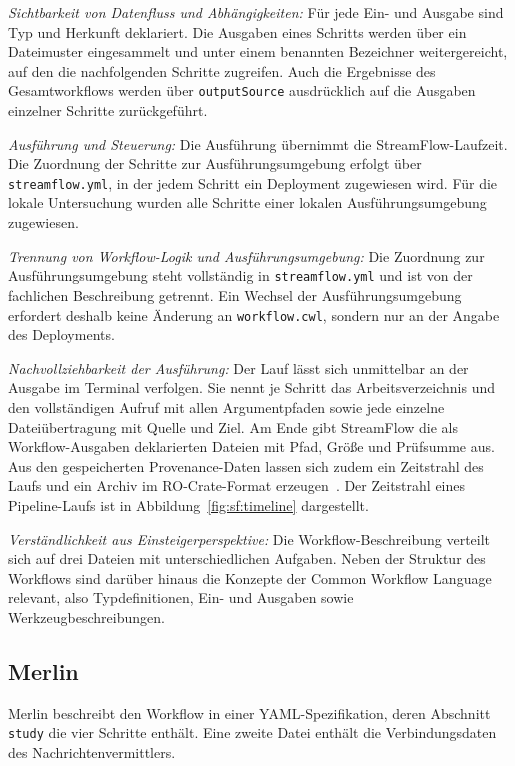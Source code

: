 \emph{Sichtbarkeit von Datenfluss und Abhängigkeiten:} Für jede Ein-
und Ausgabe sind Typ und Herkunft deklariert. Die Ausgaben eines
Schritts werden über ein Dateimuster eingesammelt und unter einem
benannten Bezeichner weitergereicht, auf den die nachfolgenden
Schritte zugreifen. Auch die Ergebnisse des Gesamtworkflows werden
über \texttt{outputSource} ausdrücklich auf die Ausgaben einzelner
Schritte zurückgeführt.

\emph{Ausführung und Steuerung:} Die Ausführung übernimmt die
StreamFlow-Laufzeit. Die Zuordnung der Schritte zur
Ausführungsumgebung erfolgt über \texttt{streamflow.yml}, in der
jedem Schritt ein Deployment zugewiesen wird. Für die lokale
Untersuchung wurden alle Schritte einer lokalen Ausführungsumgebung
zugewiesen.

\emph{Trennung von Workflow-Logik und Ausführungsumgebung:} Die
Zuordnung zur Ausführungsumgebung steht vollständig in
\texttt{streamflow.yml} und ist von der fachlichen Beschreibung
getrennt. Ein Wechsel der Ausführungsumgebung erfordert deshalb keine
Änderung an \texttt{workflow.cwl}, sondern nur an der Angabe des
Deployments.


\emph{Nachvollziehbarkeit der Ausführung:} Der Lauf lässt sich
unmittelbar an der Ausgabe im Terminal verfolgen. Sie nennt je Schritt
das Arbeitsverzeichnis und den vollständigen Aufruf mit allen
Argumentpfaden sowie jede einzelne Dateiübertragung mit Quelle und
Ziel. Am Ende gibt StreamFlow die als Workflow-Ausgaben deklarierten
Dateien mit Pfad, Größe und Prüfsumme aus. Aus den gespeicherten
Provenance-Daten lassen sich zudem ein Zeitstrahl des Laufs und ein
Archiv im RO-Crate-Format erzeugen~\cite{streamflowdocs-inspect}. Der
Zeitstrahl eines Pipeline-Laufs ist in
Abbildung~\ref{fig:sf:timeline} dargestellt.

\emph{Verständlichkeit aus Einsteigerperspektive:} Die
Workflow-Beschreibung verteilt sich auf drei Dateien mit
unterschiedlichen Aufgaben. Neben der Struktur des Workflows sind
darüber hinaus die Konzepte der Common Workflow Language relevant,
also Typdefinitionen, Ein- und Ausgaben sowie
Werkzeugbeschreibungen.

\subsection{Merlin}
\label{sec:lokal:pipeline:merlin}

Merlin beschreibt den Workflow in einer YAML-Spezifikation, deren
Abschnitt \texttt{study} die vier Schritte enthält. Eine zweite Datei
enthält die Verbindungsdaten des Nachrichtenvermittlers.

